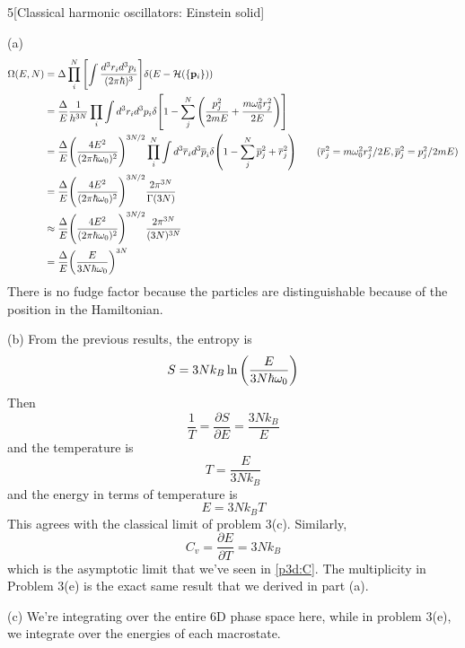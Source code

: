 \documentclass[12pt]{article}
\begin{document}
\begin{problem}{5}[Classical harmonic oscillators: Einstein solid]
\begin{solution}
(a) 
\begin{align}
    \Omega(E,N)
    &=\Delta\prod_i^N\qty[\int\frac{d^3r_id^3p_i}{(2\pi\hbar)^3}]\delta(E-\HH(\qty{\vb{p}_i}))\notag\\
    &=\frac{\Delta}{E}\frac{1}{h^{3N}}
    \prod_i\int
    d^3r_id^3p_i\delta\qty[1-\sum_j^N\qty(\frac{p_j^2}{2mE}+\frac{m\omega_0^2r_j^2}{2E})]\notag\\
    &=\frac{\Delta}{E}\qty(\frac{4E^2}{(2\pi\hbar\omega_0)^2})^{3N/2}
    \prod_i^N\int
    d^3\overline{r}_id^3\overline{p}_i\delta\qty(1-\sum_j^N\overline{p}_j^2+\overline{r}_j^2)\tag{$\overline{r}_j^2=m\omega_0^2r_j^2/2E,\overline{p}_j^2=p_j^2/2mE$}\\
    &=\frac{\Delta}{E}\qty(\frac{4E^2}{(2\pi\hbar\omega_0)^2})^{3N/2}
    \frac{2\pi^{3N}}{\Gamma(3N)}\notag\\
    &\approx\frac{\Delta}{E}\qty(\frac{4E^2}{(2\pi\hbar\omega_0)^2})^{3N/2}\frac{2\pi^{3N}}{(3N)^{3N}}\notag\\
    &=\frac{\Delta}{E}\qty(\frac{E}{3N\hbar\omega_0})^{3N}
\end{align}
There is no fudge factor because the particles are distinguishable because of
the position in the Hamiltonian.

(b) From the previous results, the entropy is
\begin{equation}
    S=3Nk_B\ln\qty(\frac{E}{3N\hbar\omega_0}) 
\end{equation}
Then
\begin{equation}
    \frac1T=\frac{\partial S}{\partial E}
    =\frac{3Nk_B}{E}
\end{equation}
and the temperature is
\begin{equation}
    T=\frac{E}{3Nk_B}
\end{equation}
and the energy in terms of temperature is
\begin{equation}
    E=3Nk_BT 
\end{equation}
This agrees with the classical limit of problem 3(c). Similarly,
\begin{equation}
    C_v=\frac{\partial E}{\partial T}=3Nk_B 
\end{equation}
which is the asymptotic limit that we've seen in \eqref{p3d:C}. The multiplicity
in Problem 3(e) is the exact same result that we derived in part (a).

(c) We're integrating over the entire 6D phase space here, while in problem
3(e), we integrate over the energies of each macrostate.
\end{solution}
\end{problem}
    
\end{document}
